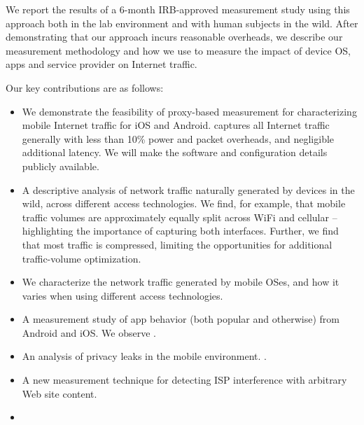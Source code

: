 We report the results of a 6-month IRB-approved measurement study using this approach both in the lab 
environment and with human subjects in the wild. After demonstrating that our approach incurs reasonable 
overheads, we describe our measurement methodology and how we use \platname to measure the 
impact of device OS, apps and service provider on Internet traffic.

Our key contributions are as follows:
\begin{itemize}
\item We demonstrate the feasibility of proxy-based measurement for characterizing mobile Internet traffic for iOS and Android. 
\platname captures all Internet traffic generally with less than 10\% power and packet overheads, and negligible additional 
latency. We will make the \platname software and configuration details publicly available.  
\item A descriptive analysis of network traffic naturally generated by devices in the wild, across different access 
technologies. We find, for example, that mobile traffic volumes are approximately equally split across WiFi and cellular -- 
highlighting the importance of capturing both interfaces. Further, we find that most traffic is compressed, limiting the 
opportunities for additional traffic-volume optimization.
\item We characterize the network traffic generated by mobile OSes, and how it varies when using different access technologies.
\item A measurement study of app behavior (both popular and otherwise) from Android and iOS. We observe . 
\item An analysis of privacy leaks in the mobile environment. .
\item A new measurement technique for detecting ISP interference with arbitrary Web site content.
\item {}
\end{itemize}

